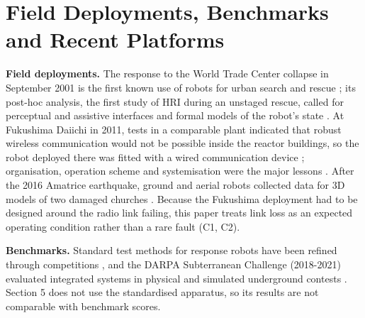 \section{Field Deployments, Benchmarks and Recent Platforms}

\textbf{Field deployments.} The response to the World Trade Center collapse in September 2001 is the first known use of robots for urban search and rescue \cite{murphy2004}; its post-hoc analysis, the first study of HRI during an unstaged rescue, called for perceptual and assistive interfaces and formal models of the robot's state \cite{casper2003}. At Fukushima Daiichi in 2011, tests in a comparable plant indicated that robust wireless communication would not be possible inside the reactor buildings, so the robot deployed there was fitted with a wired communication device \cite{nagatani2013}; organisation, operation scheme and systemisation were the major lessons \cite{kawatsuma2012}. After the 2016 Amatrice earthquake, ground and aerial robots collected data for 3D models of two damaged churches \cite{kruijff2016}. Because the Fukushima deployment had to be designed around the radio link failing, this paper treats link loss as an expected operating condition rather than a rare fault (C1, C2).

\textbf{Benchmarks.} Standard test methods for response robots have been refined through competitions \cite{jacoff2012}, and the DARPA Subterranean Challenge (2018-2021) evaluated integrated systems in physical and simulated underground contests \cite{chung2023}. Section 5 does not use the standardised apparatus, so its results are not comparable with benchmark scores.

